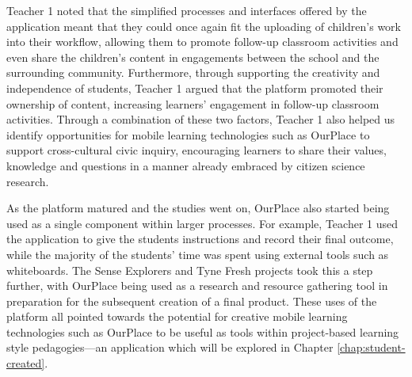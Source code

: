 Teacher 1 noted that the simplified processes and interfaces offered by the application meant that they could once again fit the uploading of children’s work into their workflow, allowing them to promote follow-up classroom activities and even share the children's content in engagements between the school and the surrounding community. Furthermore, through supporting the creativity and independence of students, Teacher 1 argued that the platform promoted their ownership of content, increasing learners’ engagement in follow-up classroom activities. Through a combination of these two factors, Teacher 1 also helped us identify opportunities for mobile learning technologies such as OurPlace to support cross-cultural civic inquiry, encouraging learners to share their values, knowledge and questions in a manner already embraced by citizen science research.

As the platform matured and the studies went on, OurPlace also started being used as a single component within larger processes. For example, Teacher 1 used the application to give the students instructions and record their final outcome, while the majority of the students’ time was spent using external tools such as whiteboards. The Sense Explorers and Tyne Fresh projects took this a step further, with OurPlace being used as a research and resource gathering tool in preparation for the subsequent creation of a final product. These uses of the platform all pointed towards the potential for creative mobile learning technologies such as OurPlace to be useful as tools within project-based learning style pedagogies---an application which will be explored in Chapter \ref{chap:student-created}.